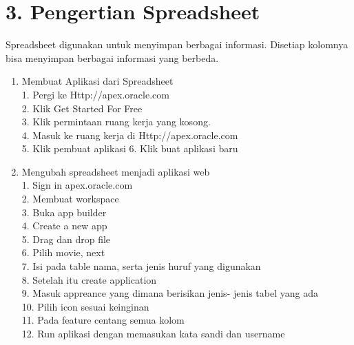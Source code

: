 \section*{\normalsize 3. Pengertian Spreadsheet}
\hspace{\parindent}Spreadsheet digunakan untuk menyimpan berbagai informasi. Disetiap kolomnya bisa menyimpan berbagai informasi yang berbeda.
\begin{enumerate}[label=\alph*.]
\item Membuat Aplikasi dari Spreadsheet\\
	1. Pergi ke Http://apex.oracle.com\\
	2. Klik Get Started For Free\\
	3. Klik permintaan ruang kerja yang kosong.\\
	4. Masuk ke ruang kerja di Http://apex.oracle.com\\
	5. Klik pembuat aplikasi 
	6. Klik buat aplikasi baru\\

\item Mengubah spreadsheet menjadi aplikasi web\\
	1. Sign in apex.oracle.com\\
	2. Membuat workspace\\
	3. Buka app builder\\ 
	4. Create a new app\\ 
	5. Drag dan drop ﬁle\\
	6. Pilih movie, next\\
	7. Isi pada table nama, serta jenis huruf yang digunakan\\
	8. Setelah itu create application\\
	9. Masuk appreance yang dimana berisikan jenis- jenis tabel yang ada\\
	10. Pilih icon sesuai 	keinginan\\ 
	11. Pada feature centang semua kolom\\
	12. Run aplikasi dengan memasukan kata sandi dan username\\
\end{enumerate}